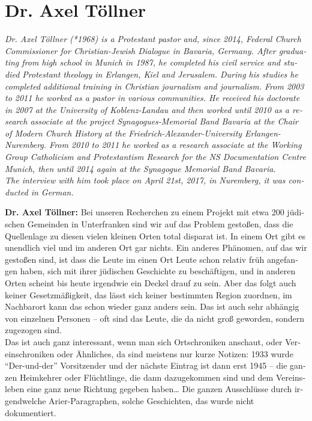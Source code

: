 \section{Dr. Axel Töllner}
\begin{otherlanguage}{ngerman}
\textit{Dr. Axel Töllner (*1968) is a Protestant pastor and, since 2014, Federal Church Commissioner for Christian-Jewish Dialogue in Bavaria, Germany. After graduating from high school in Munich in 1987, he completed his civil service and studied Protestant theology in Erlangen, Kiel and Jerusalem. During his studies he completed additional training in Christian journalism and journalism. From 2003 to 2011 he worked as a pastor in various communities. He received his doctorate in 2007 at the University of Koblenz-Landau and then worked until 2010 as a research associate at the project Synagogues-Memorial Band Bavaria at the Chair of Modern Church History at the Friedrich-Alexander-University Erlangen-Nuremberg. From 2010 to 2011 he worked as a research associate at the Working Group Catholicism and Protestantism Research for the NS Documentation Centre Munich, then until 2014 again at the Synagogue Memorial Band Bavaria. \\
The interview with him took place on April 21st, 2017, in Nuremberg, it was conducted in German.}\par  
\vspace*{2em}
\textbf{Dr. Axel Töllner:} Bei unseren Recherchen zu einem Projekt mit etwa 200 jüdischen Gemeinden in Unterfranken sind wir auf das Problem gestoßen, dass die Quellenlage zu diesen vielen kleinen Orten total disparat ist. In einem Ort gibt es unendlich viel und im anderen Ort gar nichts. Ein anderes Phänomen, auf das wir gestoßen sind, ist dass die Leute im einen Ort Leute schon relativ früh angefangen haben, sich mit ihrer jüdischen Geschichte zu beschäftigen, und in anderen Orten scheint bis heute irgendwie ein Deckel drauf zu sein. Aber das folgt auch keiner Gesetzmäßigkeit, das lässt sich keiner bestimmten Region zuordnen, im Nachbarort kann das schon wieder ganz anders sein. Das ist auch sehr abhängig von einzelnen Personen – oft sind das Leute, die da nicht groß geworden, sondern zugezogen sind.\\
Das ist auch ganz interessant, wenn man sich Ortschroniken anschaut, oder Vereinschroniken oder Ähnliches, da sind meistens nur kurze Notizen: 1933 wurde "`Der-und-der"' Vorsitzender und der nächste Eintrag ist dann erst 1945 – die ganzen Heimkehrer oder Flüchtlinge, die dann dazugekommen sind und dem Vereinsleben eine ganz neue Richtung gegeben haben… Die ganzen Ausschlüsse durch irgendwelche Arier-Paragraphen, solche Geschichten, das wurde nicht dokumentiert. 

\end{otherlanguage}
